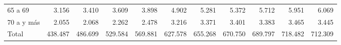\begin{tabular}{lllllllllll}
\multicolumn{1}{l}{\hspace{1em}65 a 69} &
  \multicolumn{1}{|r}{3.156} &
  \multicolumn{1}{r}{3.410} &
  \multicolumn{1}{r}{3.609} &
  \multicolumn{1}{r}{3.898} &
  \multicolumn{1}{r}{4.902} &
  \multicolumn{1}{r}{5.281} &
  \multicolumn{1}{r}{5.372} &
  \multicolumn{1}{r}{5.712} &
  \multicolumn{1}{r}{5.951} &
  \multicolumn{1}{r}{6.069} \\
\multicolumn{1}{l}{\hspace{1em}70 a y más} &
  \multicolumn{1}{|r}{2.055} &
  \multicolumn{1}{r}{2.068} &
  \multicolumn{1}{r}{2.262} &
  \multicolumn{1}{r}{2.478} &
  \multicolumn{1}{r}{3.216} &
  \multicolumn{1}{r}{3.371} &
  \multicolumn{1}{r}{3.401} &
  \multicolumn{1}{r}{3.383} &
  \multicolumn{1}{r}{3.465} &
  \multicolumn{1}{r}{3.445} \\
\multicolumn{1}{l}{\hspace{1em}Total} &
  \multicolumn{1}{|r}{438.487} &
  \multicolumn{1}{r}{486.699} &
  \multicolumn{1}{r}{529.584} &
  \multicolumn{1}{r}{569.881} &
  \multicolumn{1}{r}{627.578} &
  \multicolumn{1}{r}{655.268} &
  \multicolumn{1}{r}{670.750} &
  \multicolumn{1}{r}{689.797} &
  \multicolumn{1}{r}{718.482} &
  \multicolumn{1}{r}{712.309} \\
\cline{1-11}
\end{tabular}
